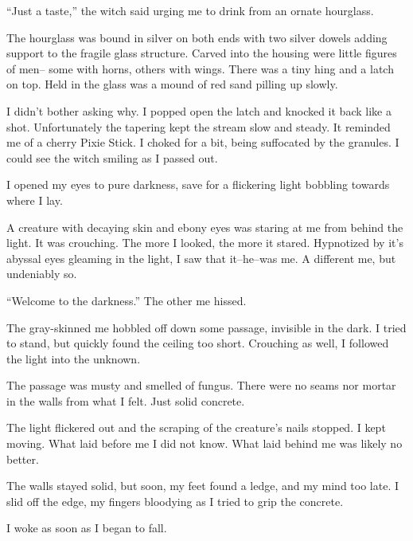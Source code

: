``Just a taste,'' the witch said urging me to drink from an ornate hourglass.
\VV


\noindent
The hourglass was bound in silver on both ends with two silver dowels adding support to
the fragile glass structure.  Carved into the housing were little figures of men--
some with horns, others with wings.  There was a tiny hing and a latch on top.
Held in the glass was a mound of red sand pilling up slowly.


I didn't bother asking why.  I popped open the latch and knocked it back like a shot.
Unfortunately the tapering kept the stream slow and steady.
It reminded me of a cherry Pixie Stick.
I choked for a bit, being suffocated by the granules.
I could see the witch smiling as I passed out.


I opened my eyes to pure darkness, save for a flickering light bobbling
towards where I lay.


A creature with decaying skin and ebony eyes was staring at me from behind the light.
It was crouching.  The more I looked, the more it stared.  Hypnotized by it's abyssal
eyes gleaming in the light, I saw that it--he--was me.
A different me, but undeniably so.
\VV


``Welcome to the darkness.''  The other me hissed.
\VV


\noindent
The gray-skinned me hobbled off down some passage, invisible in the dark.
I tried to stand, but quickly found the ceiling too short.  Crouching as well,
I followed the light into the unknown.


The passage was musty and smelled of fungus.  There were no seams nor mortar in
the walls from what I felt.  Just solid concrete.


The light flickered out and the scraping of the creature's nails stopped.
I kept moving.  What laid before me I did not know.
What laid behind me was likely no better.


The walls stayed solid, but soon, my feet found a ledge, and my mind too late.
I slid off the edge, my fingers bloodying as I tried to grip the concrete.

I woke as soon as I began to fall.
%
%
